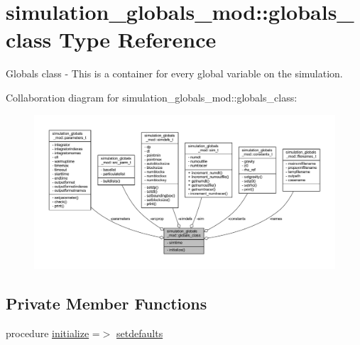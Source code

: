 \hypertarget{structsimulation__globals__mod_1_1globals__class}{}\section{simulation\+\_\+globals\+\_\+mod\+:\+:globals\+\_\+class Type Reference}
\label{structsimulation__globals__mod_1_1globals__class}


Globals class -\/ This is a container for every global variable on the simulation.  




Collaboration diagram for simulation\+\_\+globals\+\_\+mod\+:\+:globals\+\_\+class\+:\nopagebreak
\begin{figure}[H]
\begin{center}
\leavevmode
\includegraphics[width=350pt]{structsimulation__globals__mod_1_1globals__class__coll__graph}
\end{center}
\end{figure}
\subsection*{Private Member Functions}
\begin{DoxyCompactItemize}
\item 
procedure \mbox{\hyperlink{structsimulation__globals__mod_1_1globals__class_a9438f8bdec469e7cbf9b898a398f9745}{initialize}} =$>$ \mbox{\hyperlink{namespacesimulation__globals__mod_a11bedd9242e49b12d9e305d45ef9ea00}{setdefaults}}
\end{DoxyCompactItemize}
